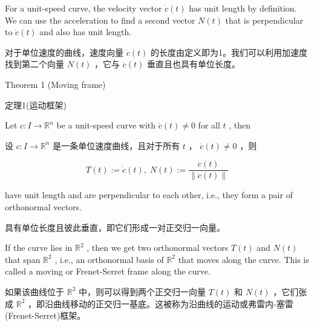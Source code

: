 For a unit-speed curve, the velocity vector \(\dot{c}\left( t\right)\) has unit length by definition. We can use the acceleration to find a second vector \(N\left( t\right)\) that is perpendicular to \(\dot{c}\left( t\right)\) and also has unit length.

\begin{tcolorbox}
对于单位速度的曲线，速度向量 \(\dot{c}\left( t\right)\) 的长度由定义即为1。我们可以利用加速度找到第二个向量 \(N\left( t\right)\) ，它与 \(\dot{c}\left( t\right)\) 垂直且也具有单位长度。
\end{tcolorbox}

\HRule

Theorem 1 (Moving frame)

\begin{tcolorbox}
定理1(运动框架)
\end{tcolorbox}

\HRule

Let \(c : I \rightarrow  {\mathbb{R}}^{n}\) be a unit-speed curve with \(\ddot{c}\left( t\right)  \neq  0\) for all \(t\) , then

\begin{tcolorbox}
设 \(c : I \rightarrow  {\mathbb{R}}^{n}\) 是一条单位速度曲线，且对于所有 \(t\) ， \(\ddot{c}\left( t\right)  \neq  0\) ，则
\end{tcolorbox}

\[
T\left( t\right)  \mathrel{\text{ := }} \dot{c}\left( t\right) ,\;N\left( t\right)  \mathrel{\text{ := }} \frac{\ddot{c}\left( t\right) }{\parallel \ddot{c}\left( t\right) \parallel } \tag{1.2}
\]

have unit length and are perpendicular to each other, i.e., they form a pair of orthonormal vectors.

\begin{tcolorbox}
具有单位长度且彼此垂直，即它们形成一对正交归一向量。
\end{tcolorbox}

If the curve lies in \({\mathbb{R}}^{2}\) , then we get two orthonormal vectors \(T\left( t\right)\) and \(N\left( t\right)\) that span \({\mathbb{R}}^{2}\) , i.e., an orthonormal basis of \({\mathbb{R}}^{2}\) that moves along the curve. This is called a moving or Frenet-Serret frame along the curve.

\begin{tcolorbox}
如果该曲线位于 \({\mathbb{R}}^{2}\) 中，则可以得到两个正交归一向量 \(T\left( t\right)\) 和 \(N\left( t\right)\) ，它们张成 \({\mathbb{R}}^{2}\) ，即沿曲线移动的正交归一基底。这被称为沿曲线的运动或弗雷内-塞雷(Frenet-Serret)框架。
\end{tcolorbox}

